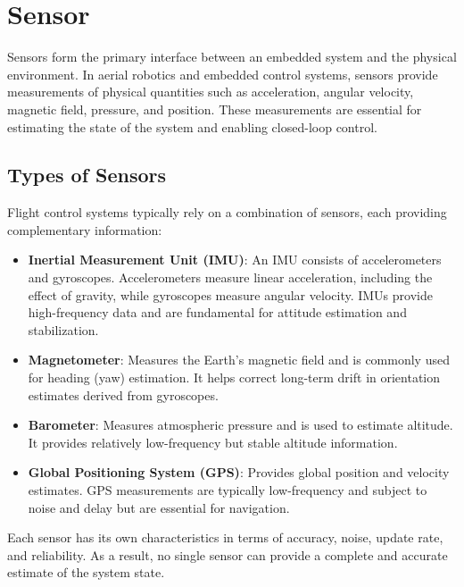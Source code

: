 \section{Sensor}
\label{sec:sensor}

Sensors form the primary interface between an embedded system and the physical environment. In aerial robotics and embedded control systems, sensors provide measurements of physical quantities such as acceleration, angular velocity, magnetic field, pressure, and position. These measurements are essential for estimating the state of the system and enabling closed-loop control.

\subsection{Types of Sensors}

Flight control systems typically rely on a combination of sensors, each providing complementary information:

\begin{itemize}
    \item \textbf{Inertial Measurement Unit (IMU)}:  
    An IMU consists of accelerometers and gyroscopes. Accelerometers measure linear acceleration, including the effect of gravity, while gyroscopes measure angular velocity. IMUs provide high-frequency data and are fundamental for attitude estimation and stabilization.

    \item \textbf{Magnetometer}:  
    Measures the Earth's magnetic field and is commonly used for heading (yaw) estimation. It helps correct long-term drift in orientation estimates derived from gyroscopes.

    \item \textbf{Barometer}:  
    Measures atmospheric pressure and is used to estimate altitude. It provides relatively low-frequency but stable altitude information.

    \item \textbf{Global Positioning System (GPS)}:  
    Provides global position and velocity estimates. GPS measurements are typically low-frequency and subject to noise and delay but are essential for navigation.

\end{itemize}

Each sensor has its own characteristics in terms of accuracy, noise, update rate, and reliability. As a result, no single sensor can provide a complete and accurate estimate of the system state.

